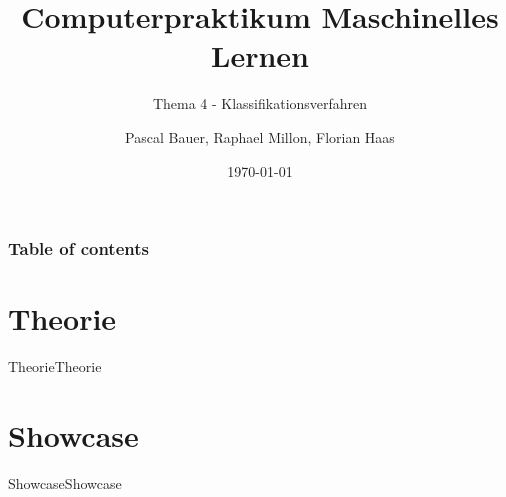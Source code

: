 \documentclass[9pt]{beamer}
\title{Computerpraktikum Maschinelles Lernen}
\subtitle{Thema 4 - Klassifikationsverfahren}
\author{Pascal Bauer, Raphael Millon, Florian Haas}
\institute{Sommersemester 2020}
\date{\today}
\begin{document}
\titlepage 

\begin{frame}
 \frametitle{Table of contents}
 \tableofcontents
\end{frame}

\section{Theorie}
\begin{frame}{Theorie}{Theorie}

\end{frame}

\section{Showcase}
\begin{frame}{Showcase}{Showcase}

\end{frame}
\end{document}
